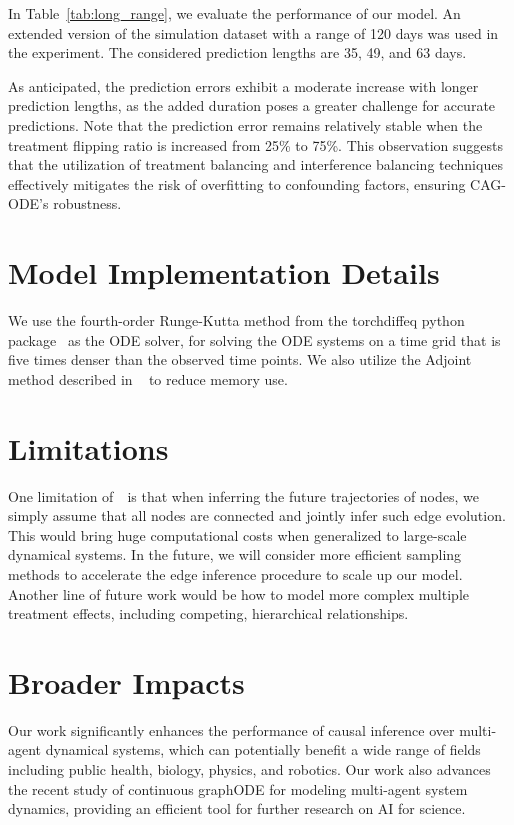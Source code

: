 In Table~\ref{tab:long_range}, we evaluate the performance of our model. An extended version of the simulation dataset with a range of 120 days was used in the experiment. The considered prediction lengths are 35, 49, and 63 days.


As anticipated, the prediction errors exhibit a moderate increase with longer prediction lengths, as the added duration poses a greater challenge for accurate predictions.  Note that the prediction error remains relatively stable when the treatment flipping ratio is increased from 25\% to 75\%. This observation suggests that the utilization of treatment balancing and interference balancing techniques effectively mitigates the risk of overfitting to confounding factors, ensuring CAG-ODE's robustness.




\section{Model Implementation Details}
We use the fourth-order Runge-Kutta method from the torchdiffeq python package~\cite{ode} as the ODE solver, for solving the ODE systems on a time grid that is five times denser than the observed time points. We also utilize the Adjoint method described in ~\cite{ode} to reduce memory use. 


\section{Limitations}
One limitation of~\model~is that when inferring the future trajectories of nodes, we simply assume that all nodes are connected and jointly infer such edge evolution. This would bring huge computational costs when generalized to large-scale dynamical systems. In the future, we will consider more efficient sampling methods to accelerate the edge inference procedure to scale up our model. Another line of future work would be how to model more complex multiple treatment effects, including competing, hierarchical relationships.

\section{Broader Impacts}
Our work significantly enhances the performance of causal inference over multi-agent dynamical systems, which can potentially benefit a wide range of fields including public health,  biology, physics, and robotics. Our work also advances the recent study of continuous graphODE for modeling multi-agent system dynamics, providing an efficient tool for further research on AI for science.